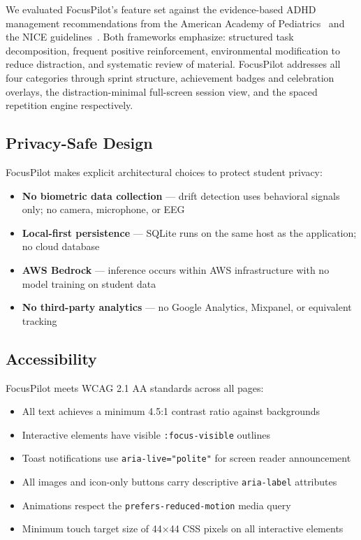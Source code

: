 \documentclass[conference]{IEEEtran}
\begin{document}
We evaluated FocusPilot's feature set against the evidence-based ADHD management recommendations from the American Academy of Pediatrics~\cite{wolraich2019clinical} and the NICE guidelines~\cite{nice2018adhd}. Both frameworks emphasize: structured task decomposition, frequent positive reinforcement, environmental modification to reduce distraction, and systematic review of material. FocusPilot addresses all four categories through sprint structure, achievement badges and celebration overlays, the distraction-minimal full-screen session view, and the spaced repetition engine respectively.

\subsection{Privacy-Safe Design}

FocusPilot makes explicit architectural choices to protect student privacy:

\begin{itemize}
  \item \textbf{No biometric data collection} — drift detection uses behavioral signals only; no camera, microphone, or EEG
  \item \textbf{Local-first persistence} — SQLite runs on the same host as the application; no cloud database
  \item \textbf{AWS Bedrock} — inference occurs within AWS infrastructure with no model training on student data
  \item \textbf{No third-party analytics} — no Google Analytics, Mixpanel, or equivalent tracking
\end{itemize}

\subsection{Accessibility}

FocusPilot meets WCAG 2.1 AA standards across all pages:
\begin{itemize}
  \item All text achieves a minimum 4.5:1 contrast ratio against backgrounds
  \item Interactive elements have visible \texttt{:focus-visible} outlines
  \item Toast notifications use \texttt{aria-live="polite"} for screen reader announcement
  \item All images and icon-only buttons carry descriptive \texttt{aria-label} attributes
  \item Animations respect the \texttt{prefers-reduced-motion} media query
  \item Minimum touch target size of 44×44 CSS pixels on all interactive elements
\end{itemize}
\end{document}
